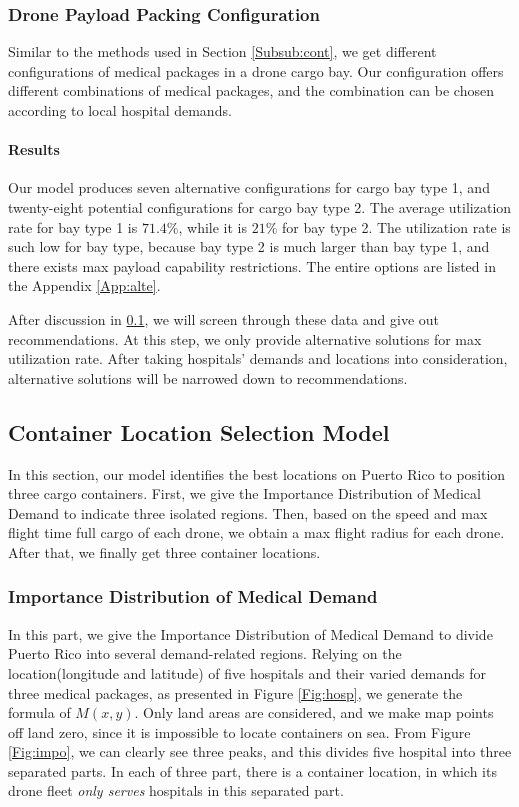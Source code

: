 \documentclass{mcmthesis}
\begin{document}
\subsubsection{Drone Payload Packing Configuration}

Similar to the methods used in Section \ref{Subsub:cont}, we get different configurations of medical packages in a drone cargo bay. Our configuration offers different combinations of medical packages, and the combination can be chosen according to local hospital demands. 

\paragraph{Results}Our model produces seven alternative configurations for cargo bay type 1, and twenty-eight potential configurations for cargo bay type 2. The average utilization rate for bay type 1 is $71.4\%$, while it is $21\%$ for bay type 2. The utilization rate is such low for bay type, because bay type 2 is much larger than bay type 1, and there exists max payload capability restrictions. The entire options are listed in the Appendix \ref{App:alte}.

After discussion in \ref{Sec:cont}, we will screen through these data and give out recommendations. At this step, we only provide alternative solutions for max utilization rate. After taking hospitals' demands and locations into consideration, alternative solutions will be narrowed down to recommendations.

\subsection{Container Location Selection Model}\label{Sec:cont}

In this section, our model identifies the best locations on Puerto Rico to position three cargo containers. First, we give the Importance Distribution of Medical Demand to indicate three isolated regions. Then, based on the speed and max flight time full cargo of each drone, we obtain a max flight radius for each drone. After that, we finally get three container locations.

\subsubsection{Importance Distribution of Medical Demand}

In this part, we give the Importance Distribution of Medical Demand to divide Puerto Rico into several demand-related regions. Relying on the location(longitude and latitude) of five hospitals and their varied demands for three medical packages, as presented in Figure \ref{Fig:hosp}, we generate the formula of $M(x,y)$. Only land areas are considered, and we make map points off land zero, since it is impossible to locate containers on sea. From Figure \ref{Fig:impo}, we can clearly see three peaks, and this divides five hospital into three separated parts. In each of three part, there is a container location, in which its drone fleet \emph{only serves} hospitals in this separated part.
\end{document}
